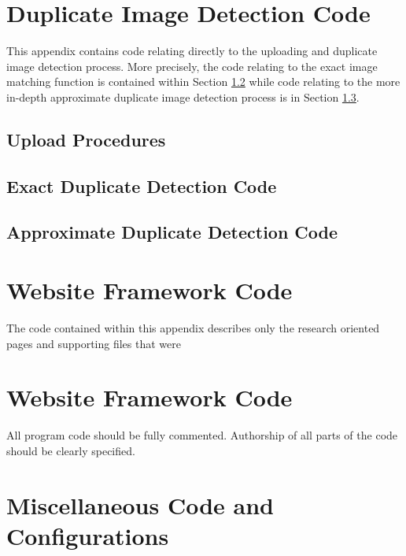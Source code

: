 %
%

\chapter{Duplicate Image Detection Code}\label{appa:didcode}
This appendix contains code relating directly to the uploading and duplicate image detection process. More precisely, the code relating to the exact image matching function is contained within Section \ref{appa:exact} while code relating to the more in-depth approximate duplicate image detection process is in Section \ref{appa:approx}.

\section{Upload Procedures}\label{appa:upload}


\section{Exact Duplicate Detection Code}\label{appa:exact}


\section{Approximate Duplicate Detection Code}\label{appa:approx}



\chapter{Website Framework Code}\label{appb:wejbcode}
The code contained within this appendix describes only the research oriented
pages and supporting files that were 


%

\chapter{Website Framework Code}\label{appb:webcode}
All program code should be fully commented. Authorship
of all parts of the code should be clearly specified. 

\chapter{Miscellaneous Code and Configurations}\label{appc:misccode}
